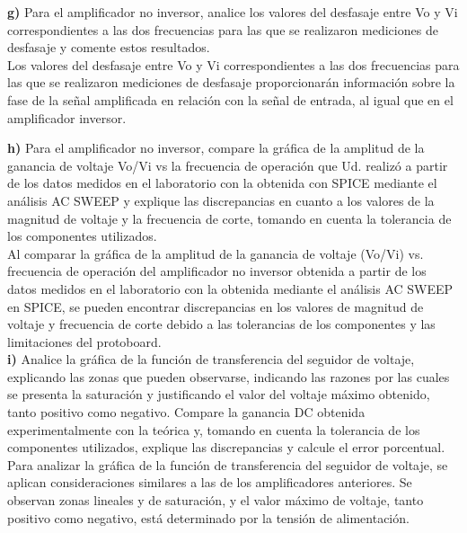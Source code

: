 \documentclass[12pt]{article}
\begin{document}
	\noindent \textbf{g)} Para el amplificador no inversor, analice los valores del desfasaje entre Vo y Vi correspondientes a las dos frecuencias para las que se realizaron mediciones de desfasaje y comente estos resultados.\\
	
	Los valores del desfasaje entre Vo y Vi correspondientes a las dos frecuencias para las que se realizaron mediciones de desfasaje proporcionarán información sobre la fase de la señal amplificada en relación con la señal de entrada, al igual que en el amplificador inversor.
	
	\noindent \textbf{h)} Para el amplificador no inversor, compare la gráfica de la amplitud de la ganancia de voltaje Vo/Vi vs la frecuencia de operación que Ud. realizó a partir de los datos	medidos en el laboratorio con la obtenida con SPICE mediante el análisis AC SWEEP y explique las discrepancias en cuanto a los valores de la magnitud de voltaje y la frecuencia de corte, tomando en cuenta la tolerancia de los componentes utilizados.\\
	
	Al comparar la gráfica de la amplitud de la ganancia de voltaje (Vo/Vi) vs. frecuencia de operación del amplificador no inversor obtenida a partir de los datos medidos en el laboratorio con la obtenida mediante el análisis AC SWEEP en SPICE, se pueden encontrar discrepancias en los valores de magnitud de voltaje y frecuencia de corte debido a las tolerancias de los componentes y las limitaciones del protoboard.\\
	
	\noindent \textbf{i)} Analice la gráfica de la función de transferencia del seguidor de voltaje, explicando	las zonas que pueden observarse, indicando las razones por las cuales se presenta la saturación y justificando el valor del voltaje máximo obtenido, tanto positivo como	negativo. Compare la ganancia DC obtenida experimentalmente con la teórica y, tomando en cuenta la tolerancia de los componentes utilizados, explique las discrepancias y calcule el error porcentual.\\
	
	Para analizar la gráfica de la función de transferencia del seguidor de voltaje, se aplican consideraciones similares a las de los amplificadores anteriores. Se observan zonas lineales y de saturación, y el valor máximo de voltaje, tanto positivo como negativo, está determinado por la tensión de alimentación.\\
	
\end{document}
